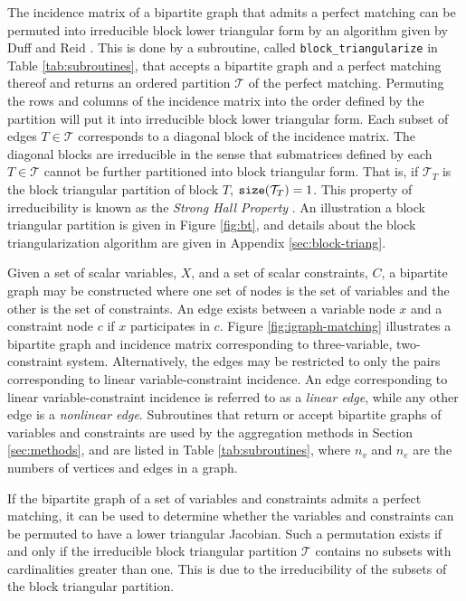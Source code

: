 \documentclass[smallextended]{svjour3}
\begin{document}
The incidence matrix of a bipartite graph that admits a perfect matching can be
permuted into irreducible block lower triangular form by an algorithm given by
Duff and Reid \cite{duff1978implementation,duff1978algorithm}.
This is done by a subroutine, called {\tt block\_triangularize} in Table
\ref{tab:subroutines}, that accepts a bipartite graph and a perfect matching thereof
and returns an ordered partition $\mathcal{T}$ of the perfect matching. Permuting the
rows and columns of the incidence matrix into the order defined by the partition will
put it into irreducible block lower triangular form. Each subset of edges
$T\in \mathcal{T}$ corresponds to a diagonal block of the incidence matrix.
The diagonal blocks are irreducible in the sense that submatrices defined by each
$T\in \mathcal{T}$ cannot be further partitioned into block triangular form.
That is, if $\mathcal{T}_T$ is the block triangular partition of block $T$,
${\tt size}(\mathcal{T}_T)=1$. This property of irreducibility is known as the
{\it Strong Hall Property} \cite{scott2023,coleman1986}.
An illustration a block triangular partition is given in Figure \ref{fig:bt},
and details about the block triangularization algorithm are given in Appendix
\ref{sec:block-triang}.

Given a set of scalar variables, $X$, and a set of scalar constraints, $C$,
a bipartite graph may be constructed where one set of nodes is the set
of variables and the other is the set of constraints. An edge exists
between a variable node $x$ and a constraint node $c$ if $x$ participates
in $c$.
Figure \ref{fig:igraph-matching} illustrates a bipartite graph and incidence matrix
corresponding to three-variable, two-constraint system.
Alternatively, the edges may be restricted to only the pairs
corresponding to linear variable-constraint incidence.
An edge corresponding to linear variable-constraint incidence is referred to as a
{\it linear edge}, while any other edge is a {\it nonlinear edge}.
Subroutines that return or accept bipartite graphs of variables and constraints
are used by the aggregation methods in Section \ref{sec:methods},
and are listed in Table \ref{tab:subroutines}, where $n_v$ and $n_e$ are the numbers
of vertices and edges in a graph.

If the bipartite graph of a set of variables and constraints admits a perfect matching,
it can be used to determine whether the variables and constraints can be permuted
to have a lower triangular Jacobian. Such a permutation exists if and only if the
irreducible block triangular partition $\mathcal{T}$ contains no subsets with
cardinalities greater than one. This is due to the irreducibility of the subsets
of the block triangular partition.
\end{document}

